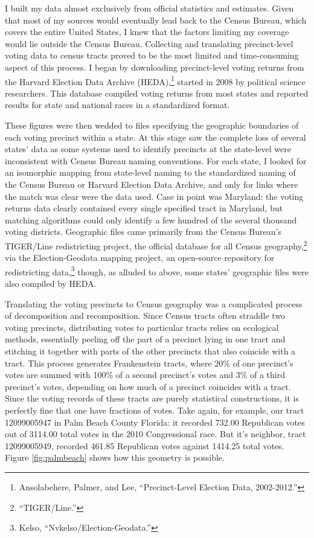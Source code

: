 \documentclass[
]{article}
\begin{document}
I built my data almost exclusively from official statistics and estimates.
Given that most of my sources would eventually lead back to the Census Bureau, which covers the entire United States, I knew that the factors limiting my coverage would lie outside the Census Bureau.
Collecting and translating precinct-level voting data to census tracts proved to be the most limited and time-consuming aspect of this process.
I began by downloading precinct-level voting returns from the Harvard Election Data Archive (HEDA),\footnote{Ansolabehere, Palmer, and Lee, ``Precinct-Level Election Data, 2002-2012.''} started in 2008 by political science researchers.
This database compiled voting returns from most states and reported results for state and national races in a standardized format.

These figures were then wedded to files specifying the geographic boundaries of each voting precinct within a state.
At this stage saw the complete loss of several states' data as some systems used to identify precincts at the state-level were inconsistent with Census Bureau naming conventions.
For each state, I looked for an isomorphic mapping from state-level naming to the standardized naming of the Census Bureau or Harvard Election Data Archive, and only for links where the match was clear were the data used.
Case in point was Maryland: the voting returns data clearly contained every single specified tract in Maryland, but matching algorithms could only identify a few hundred of the several thousand voting districts.
Geographic files came primarily from the Census Bureau's TIGER/Line redistricting project, the official database for all Census geography,\footnote{``TIGER/Line.''} via the Election-Geodata mapping project, an open-source repository for redistricting data,\footnote{Kelso, ``Nvkelso/Election-Geodata.''} though, as alluded to above, some states' geographic files were also compiled by HEDA.

Translating the voting precincts to Census geography was a complicated process of decomposition and recomposition.
Since Census tracts often straddle two voting precincts, distributing votes to particular tracts relies on ecological methods, essentially peeling off the part of a precinct lying in one tract and stitching it together with parts of the other precincts that also coincide with a tract.
This process generates Frankenstein tracts, where 20\% of one precinct's votes are summed with 100\% of a second precinct's votes and 3\% of a third precinct's votes, depending on how much of a precinct coincides with a tract.
Since the voting records of these tracts are purely statistical constructions, it is perfectly fine that one have fractions of votes.
Take again, for example, our tract 12099005947 in Palm Beach County Florida: it recorded 732.00 Republican votes out of 3114.00 total votes in the 2010 Congressional race.
But it's neighbor, tract 12099005949, recorded 461.85 Republican votes against 1414.25 total votes.
Figure \ref{fig:palmbeach} shows how this geometry is possible.
\end{document}
